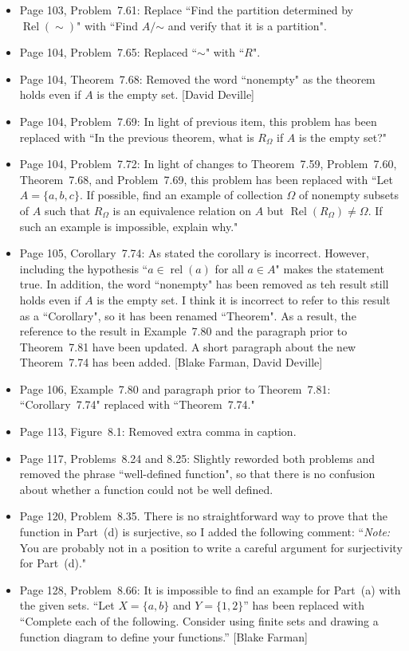 \documentclass[11pt]{article}%
\DeclareMathOperator{\rel}{rel}
\newcommand{\Rel}{\operatorname{Rel}}
\begin{document}
\begin{itemize}
\item Page 103, Problem~7.61: Replace ``Find the partition determined by $\Rel(\sim)$" with ``Find $A/\mathord\sim$ and verify that it is a partition".
\item Page 104, Problem~7.65: Replaced ``$\sim$" with ``$R$".
\item Page 104, Theorem~7.68: Removed the word ``nonempty" as the theorem holds even if $A$ is the empty set. [David Deville]
\item Page 104, Problem~7.69: In light of previous item, this problem has been replaced  with ``In the previous theorem, what is $R_{\Omega}$ if $A$ is the empty set?"
\item Page 104, Problem~7.72: In light of changes to Theorem~7.59, Problem~7.60, Theorem~7.68, and Problem~7.69, this problem has been replaced  with ``Let $A=\{a,b,c\}$. If possible, find an example of collection $\Omega$ of nonempty subsets of $A$ such that $R_{\Omega}$ is an equivalence relation on $A$ but $\Rel(R_{\Omega})\neq \Omega$.  If such an example is impossible, explain why."
\item Page 105, Corollary~7.74: As stated the corollary is incorrect. However, including the hypothesis ``$a\in\rel(a)$ for all $a\in A$" makes the statement true. In addition, the word ``nonempty" has been removed as teh result still holds even if $A$ is the empty set. I think it is incorrect to refer to this result as a ``Corollary", so it has been renamed ``Theorem". As a result, the reference to the result in Example~7.80 and the paragraph prior to Theorem~7.81 have been updated. A short paragraph about the new Theorem~7.74 has been added. [Blake Farman, David Deville]
\item Page 106, Example~7.80 and paragraph prior to Theorem~7.81: ``Corollary~7.74" replaced with ``Theorem~7.74."
\item Page 113, Figure~8.1: Removed extra comma in caption.
\item Page 117, Problems~8.24 and 8.25: Slightly reworded both problems and removed the phrase ``well-defined function", so that there is no confusion about whether a function could not be well defined.
\item Page 120, Problem~8.35. There is no straightforward way to prove that the function in Part~(d) is surjective, so I added the following comment: ``\emph{Note:} You are probably not in a position to write a careful argument for surjectivity for Part~(d)."  
\item Page 128, Problem~8.66: It is impossible to find an example for Part~(a) with the given sets.  ``Let $X=\{a,b\}$ and $Y=\{1,2\}$'' has been replaced with ``Complete each of the following. Consider using finite sets and drawing a function diagram to define your functions.'' [Blake Farman]

\end{itemize}
\end{document}
